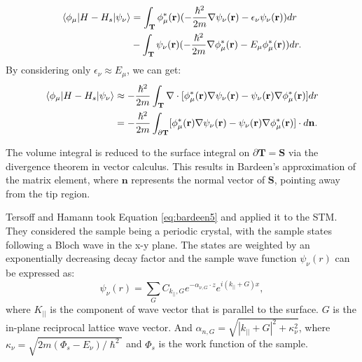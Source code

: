 \begin{equation}
	\label{eq:bardeen_matrixelement}
	\begin{aligned}
		\braket{\phi_{\mu}|H-H_s|\psi_{\nu}} &= \int_\mathbf{T}\phi_{\mu}^*(\mathbf{r})(-\frac{\hslash^2}{2m} \nabla \psi_{\nu}(\mathbf{r}) - \epsilon_{\nu}\psi_{\nu}(\mathbf{r}))dr \\ 
		& - \int_\mathbf{T}\psi_{\nu}(\mathbf{r})(-\frac{\hslash^2}{2m} \nabla \phi_{\mu}^*(\mathbf{r}) - E_{\mu}\phi_{\mu}^*(\mathbf{r}))dr.
	\end{aligned}
\end{equation}
By considering only $\epsilon_{\nu} \approx E_{\mu}$, we can get:
\begin{align}
	\label{eq:bardeen4}
	\braket{\phi_{\mu}|H-H_s|\psi_{\nu}} &\approx -\frac{\hslash^2}{2m}\int_\mathbf{T}\nabla \cdot [\phi_{\mu}^*(\mathbf{r})\nabla\psi_{\nu}(\mathbf{r})-\psi_{\nu}(\mathbf{r})\nabla\phi_{\mu}^*(\mathbf{r})]dr\\ \label{eq:bardeen5}
	& = -\frac{\hslash^2}{2m}\int_{\partial\mathbf{T}}[\phi_{\mu}^*(\mathbf{r})\nabla\psi_{\nu}(\mathbf{r})-\psi_{\nu}(\mathbf{r})\nabla\phi_{\mu}^*(\mathbf{r})]\cdot d\mathbf{n}.
\end{align}

The volume integral is reduced to the surface integral on $\partial \mathbf{T} = \mathbf{S}$ via the divergence theorem in vector calculus. This results in Bardeen's approximation of the matrix element, where $\mathbf{n}$ represents the normal vector of $\mathbf{S}$, pointing away from the tip region.  

Tersoff and Hamann took Equation \ref{eq:bardeen5} and applied it to the \ac{STM}. They considered the sample being a periodic crystal, with the sample states following a Bloch wave in the x-y plane. The states are weighted by an exponentially decreasing decay factor and the sample wave function $\psi_{\nu}(r)$ can be expressed as:
\begin{equation}
	\label{eq:sample_wavefunction}
	\psi_{\nu}(r) = \sum_G C_{k_{||},G} e^{-\alpha_{\nu,G}\cdot z }e^{i(k_{||}+G)x},
\end{equation}
where $K_{||}$ is the component of wave vector that is parallel to the surface. $G$ is the in-plane reciprocal lattice wave vector. And $\alpha_{n,G} = \sqrt{|k_{||}+G|^2 + \kappa_{\nu}^2}$, where $\kappa_{\nu} = \sqrt{2m(\Phi_s - E_{\nu})/\hslash^2}$ and $\Phi_s$ is the work function of the sample. 

